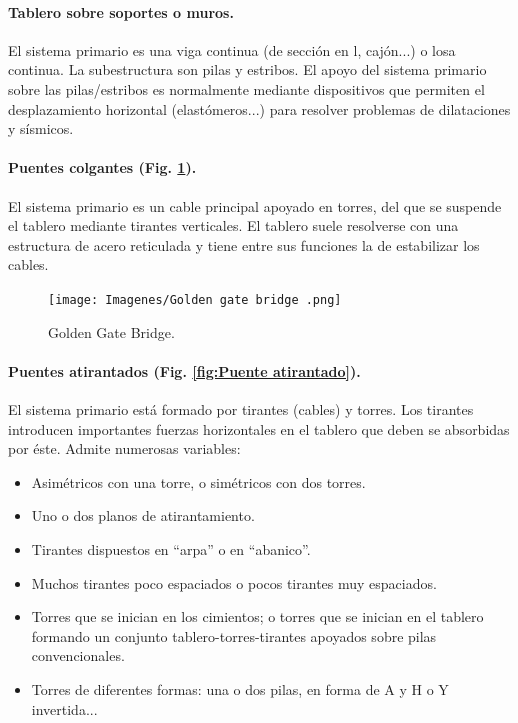 \paragraph{Tablero sobre soportes o muros.}
El sistema primario es una viga continua (de sección en l, cajón...) o losa continua. La subestructura son pilas y estribos. El apoyo del sistema primario sobre las pilas/estribos es normalmente mediante dispositivos que permiten el desplazamiento horizontal (elastómeros...) para resolver problemas de dilataciones y sísmicos.

\paragraph{Puentes colgantes (Fig. \ref{fig:Puente colgante}).}
El sistema primario es un cable principal apoyado en torres, del que se suspende el tablero mediante tirantes verticales. El tablero suele resolverse con una estructura de acero reticulada y tiene entre sus funciones la de estabilizar los cables.

\begin{figure}[h]
    \centering
    \texttt{[image: Imagenes/Golden gate bridge .png]}
    \caption{Golden Gate Bridge.}
    \label{fig:Puente colgante}
\end{figure}

\paragraph{Puentes atirantados (Fig. \ref{fig:Puente atirantado}).}
El sistema primario está formado por tirantes (cables) y torres. Los tirantes introducen importantes fuerzas horizontales en el tablero que deben se absorbidas por éste. Admite numerosas variables:
\begin{itemize}
    \item Asimétricos con una torre, o simétricos con dos torres.
    \item Uno o dos planos de atirantamiento.
    \item Tirantes dispuestos en ``arpa'' o en ``abanico''.
    \item Muchos tirantes poco espaciados o pocos tirantes muy espaciados.
    \item Torres que se inician en los cimientos; o torres que se inician en el tablero formando un conjunto tablero-torres-tirantes apoyados sobre pilas convencionales.
    \item Torres de diferentes formas: una o dos pilas, en forma de A y H o Y invertida...
\end{itemize}

